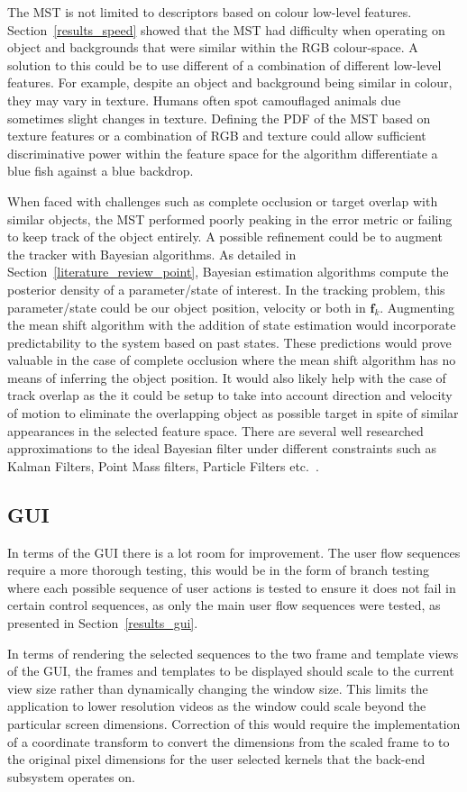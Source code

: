 The MST is not limited to descriptors based on colour low-level features.
Section~\ref{results_speed} showed that the MST had difficulty when operating on
object and backgrounds that were similar within the RGB colour-space. A solution
to this could be to use different of a combination of different low-level
features. For example, despite an object and background being similar in colour,
they may vary in texture. Humans often spot camouflaged animals due sometimes
slight changes in texture. 
Defining the PDF of the MST based on texture features or a combination of RGB
and texture could allow sufficient discriminative power within the feature space
for the algorithm differentiate a blue fish against a blue backdrop.

When faced with challenges such as complete occlusion or target overlap with
similar objects, the MST performed poorly peaking in the error metric or failing
to keep track of the object entirely. A possible refinement could be to augment
the tracker with Bayesian algorithms. As detailed in
Section~\ref{literature_review_point}, Bayesian estimation algorithms compute
the posterior density of a parameter/state of interest. In the tracking
problem, this parameter/state could be our object position, velocity or both in
$\mathbf{f}_k$. 
Augmenting the mean shift algorithm with the addition of state estimation  would
incorporate predictability to the system based on past states. These predictions
would prove valuable in the case of complete occlusion where the mean shift
algorithm has no means of inferring the object position. It would also likely
help with the case of track overlap as the it could be setup to take into
account direction and velocity of motion to eliminate the overlapping object as
possible target in spite of similar appearances in the selected
feature space.
There are several well researched approximations to the ideal Bayesian filter
under different constraints such as Kalman Filters, Point Mass filters, Particle
Filters etc.~\cite{Challa2011}.  


\subsection{GUI}
In terms of the GUI there is a lot room for improvement. The user flow sequences
require a more thorough testing, this would be in the form of branch testing where
each possible sequence of user actions is tested to ensure it does not fail in
certain control sequences, as only the main user flow sequences were tested, as
presented in Section~\ref{results_gui}.

In terms of rendering the selected sequences to the two frame and template views
of the GUI, the frames and templates to be displayed should scale to the current
view size rather than dynamically changing the window size. This limits the
application to lower resolution videos as the window could scale beyond the
particular screen dimensions.
Correction of this would require the implementation of a coordinate transform
to convert the dimensions from the scaled frame to to the original pixel
dimensions for the user selected kernels that the back-end subsystem operates on.



